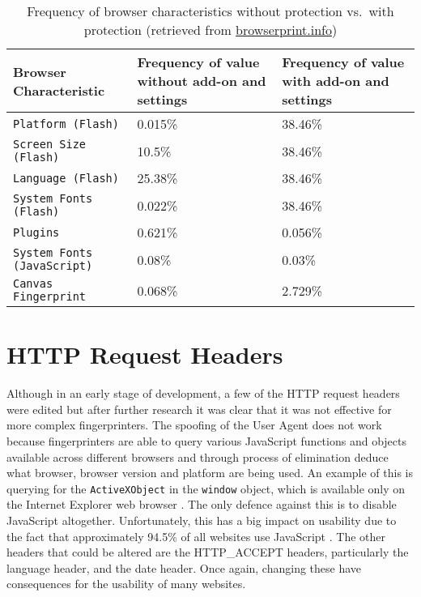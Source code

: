 \begin{table}[h!]
\centering
\begin{tabular}{| p{6cm} | p{4cm} | p{4cm} |}
    \hline
    \textbf{Browser Characteristic} & \textbf{Frequency of value without add-on and settings} & \textbf{Frequency of value with add-on and settings} \\ \hline
    \texttt{Platform (Flash)} & {0.015\%} & {38.46\%} \\ \hline
    \texttt{Screen Size (Flash)} & {10.5\%} & {38.46\%} \\ \hline
    \texttt{Language (Flash)} & {25.38\%} & {38.46\%} \\ \hline
    \texttt{System Fonts (Flash)} & {0.022\%} & {38.46\%} \\ \hline
    \texttt{Plugins} & {0.621\%} & {0.056\%} \\ \hline
    \texttt{System Fonts (JavaScript)} & {0.08\%} & {0.03\%} \\ \hline
    \texttt{Canvas Fingerprint} & {0.068\%} & {2.729\%} \\
    \hline
\end{tabular}
\caption{Frequency of browser characteristics without protection vs.\ with protection (retrieved from \url{browserprint.info})}
\label{tab:results}
\end{table}

\section{HTTP Request Headers}

Although in an early stage of development, a few of the HTTP request headers were edited but after further research it was clear that it was not effective for more complex fingerprinters.
The spoofing of the User Agent does not work because fingerprinters are able to query various JavaScript functions and objects available across different browsers and through process of elimination deduce what browser, browser version and platform are being used.
An example of this is querying for the \texttt{ActiveXObject} in the \texttt{window} object, which is available only on the Internet Explorer web browser \citep{activeX}.
The only defence against this is to disable JavaScript altogether.
Unfortunately, this has a big impact on usability due to the fact that approximately 94.5\% of all websites use JavaScript \citep{w3-javascript}.
The other headers that could be altered are the HTTP\_ACCEPT headers, particularly the language header, and the date header.
Once again, changing these have consequences for the usability of many websites.

